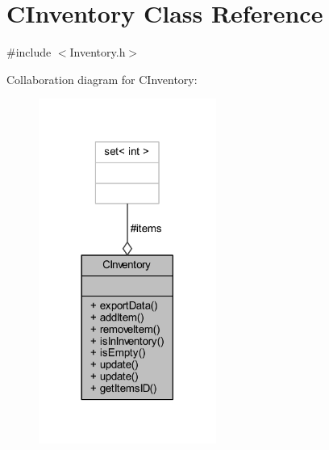 \hypertarget{class_c_inventory}{}\section{C\+Inventory Class Reference}
\label{class_c_inventory}


{\ttfamily \#include $<$Inventory.\+h$>$}



Collaboration diagram for C\+Inventory\+:\nopagebreak
\begin{figure}[H]
\begin{center}
\leavevmode
\includegraphics[width=165pt]{class_c_inventory__coll__graph}
\end{center}
\end{figure}
